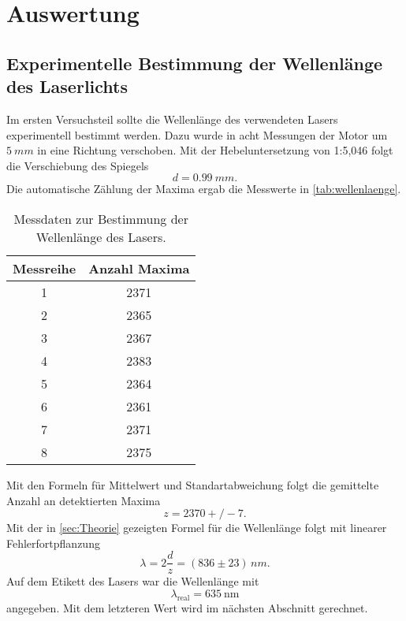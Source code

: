 \section{Auswertung}
\label{sec:Auswertung}

\subsection{Experimentelle Bestimmung der Wellenlänge des Laserlichts}
\label{sec:Experimentelle Bestimmung der Wellenlänge des Laserlichts}
Im ersten Versuchsteil sollte die Wellenlänge des verwendeten Lasers experimentell
bestimmt werden. Dazu wurde in acht Messungen der Motor um $\SI{5}{mm}$ in eine
Richtung verschoben. Mit der Hebeluntersetzung von 1:5,046 folgt die Verschiebung 
des Spiegels
\begin{equation}
	d = \SI{0,99}{mm}.
\end{equation}
Die automatische Zählung der Maxima ergab die Messwerte in \autoref{tab:wellenlaenge}.
\begin{table}
  \centering
  \caption{Messdaten zur Bestimmung der Wellenlänge des Lasers.}
  \label{tab:wellenlaenge}
  \begin{tabular}{c c}
  \toprule
  Messreihe & Anzahl Maxima\\
  \midrule
    1 & 2371 \\
    2 & 2365 \\
    3 & 2367 \\
    4 & 2383 \\
    5 & 2364 \\
    6 & 2361 \\
    7 & 2371 \\
    8 & 2375 \\
  \bottomrule
  \end{tabular}
\end{table}
Mit den Formeln für Mittelwert und Standartabweichung folgt die gemittelte Anzahl an
detektierten Maxima
\begin{equation}
	z = 2370+/-7.
\end{equation}
Mit der in \autoref{sec:Theorie} gezeigten Formel für die Wellenlänge folgt mit linearer
Fehlerfortpflanzung 
\begin{equation}
	\lambda = 2 \frac{d}{z} = (836 \pm 23) \, \si{nm}.
\end{equation}
Auf dem Etikett des Lasers war die Wellenlänge mit
\begin{equation}
	\label{eqn:wellenlaenge-real}
	\lambda_\text{real} = \SI{635}{\nano\meter}
\end{equation}
angegeben. Mit dem letzteren Wert wird im nächsten Abschnitt gerechnet.

